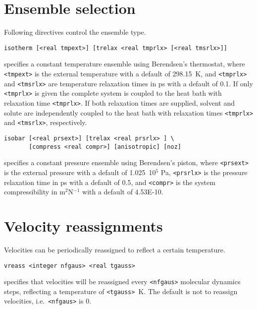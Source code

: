 \section{Ensemble selection}
Following directives control the ensemble type.

\begin{description}

\item
\begin{verbatim}
isotherm [<real tmpext>] [trelax <real tmprlx> [<real tmsrlx>]]
\end{verbatim}
specifies a constant temperature ensemble using Berendsen's thermostat,
where \verb+<tmpext>+ is the external temperature with a default of 298.15~K,
and \verb+<tmprlx>+ and \verb+<tmsrlx>+ are temperature relaxation times in ps 
with a default of 0.1. If only \verb+<tmprlx>+ is given the complete system
is coupled to the heat bath with relaxation time \verb+<tmprlx>+. If both
relaxation times are supplied, solvent and solute are independently coupled
to the heat bath with relaxation times \verb+<tmprlx>+ and \verb+<tmsrlx>+,
respectively.

\item
\begin{verbatim}
isobar [<real prsext>] [trelax <real prsrlx> ] \
       [compress <real compr>] [anisotropic] [noz]
\end{verbatim}
specifies a constant pressure ensemble using Berendsen's piston,
where \verb+<prsext>+ is the external pressure with a default of 1.025~10$^5$ Pa,
\verb+<prsrlx>+ is the pressure relaxation time in ps with a default of 0.5, and
\verb+<compr>+ is the system compressibility in m$^2$N$^{-1}$ with a
default of 4.53E-10.
\end{description}

\section{Velocity reassignments}
Velocities can be periodically reassigned to reflect a certain temperature.
\begin{description}
\item
\begin{verbatim}
vreass <integer nfgaus> <real tgauss>
\end{verbatim}
specifies that velocities will be reassigned every \verb+<nfgaus>+ molecular
dynamics steps, reflecting a temperature of \verb+<tgauss>+~K. The default
is not to reassign velocities, i.e.\ \verb+<nfgaus>+ is 0.
\end{description}

